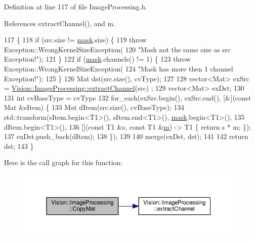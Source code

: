 Definition at line 117 of file Image\+Processing.\+h.



References extract\+Channel(), and m.


\begin{DoxyCode}
117                                                                   \{
118     \textcolor{keywordflow}{if} (src.size != \hyperlink{_gen_blob_8m_a5d76cc2129e79ba1941d2cc2f53b9e8e}{mask}.size) \{
119       \textcolor{keywordflow}{throw} Exception::WrongKernelSizeException(
120           \textcolor{stringliteral}{"Mask not the same size as src Exception!"});
121     \}
122     \textcolor{keywordflow}{if} (\hyperlink{_gen_blob_8m_a5d76cc2129e79ba1941d2cc2f53b9e8e}{mask}.channels() != 1) \{
123       \textcolor{keywordflow}{throw} Exception::WrongKernelSizeException(
124           \textcolor{stringliteral}{"Mask has more then 1 channel Exception!"});
125     \}
126     Mat dst(src.size(), cvType);
127 
128     vector<Mat> exSrc = \hyperlink{class_vision_1_1_image_processing_ad5fa51caaabb8cb0fc2c15f645695a3c}{Vision::ImageProcessing::extractChannel}(src)
      ;
129     vector<Mat> exDst;
130 
131     \textcolor{keywordtype}{int} cvBaseType = cvType %
132     for\_each(exSrc.begin(), exSrc.end(), [&](\textcolor{keyword}{const} Mat &sItem) \{
133       Mat dItem(src.size(), cvBaseType);
134       std::transform(sItem.begin<T1>(), sItem.end<T1>(), \hyperlink{_gen_blob_8m_a5d76cc2129e79ba1941d2cc2f53b9e8e}{mask}.begin<T1>(),
135                      dItem.begin<T1>(),
136                      [](\textcolor{keyword}{const} T1 &s, \textcolor{keyword}{const} T1 &\hyperlink{_gen_blob_8m_ab3cd915d758008bd19d0f2428fbb354a}{m}) -> T1 \{ return s * m; \});
137       exDst.push\_back(dItem);
138     \});
139 
140     merge(exDst, dst);
141 
142     \textcolor{keywordflow}{return} dst;
143   \}
\end{DoxyCode}


Here is the call graph for this function\+:\nopagebreak
\begin{figure}[H]
\begin{center}
\leavevmode
\includegraphics[width=350pt]{class_vision_1_1_image_processing_a5a255d7f5b10bcb199e66d1e00ab9d1a_cgraph}
\end{center}
\end{figure}


